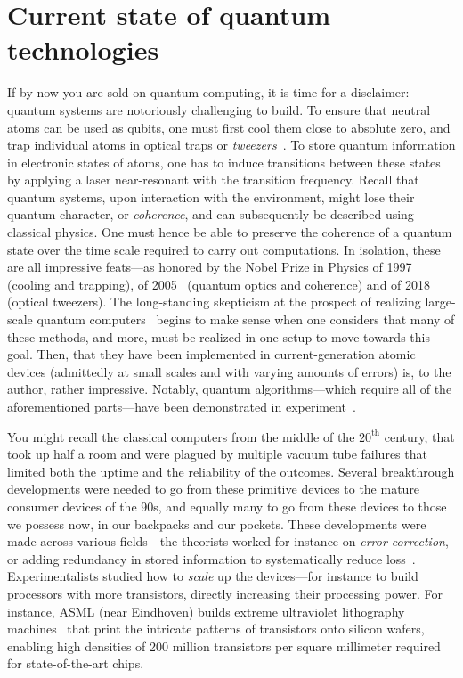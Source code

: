 \documentclass[main.tex]{subfiles}
\begin{document}
\section{Current state of quantum technologies}
If by now you are sold on quantum computing, it is time for a disclaimer: quantum systems are notoriously challenging to build. To ensure that neutral atoms can be used as qubits, one must first cool them close to absolute zero, and trap individual atoms in optical traps or \emph{tweezers}~\cite{shannon2021}. To store quantum information in electronic states of atoms, one has to induce transitions between these states by applying a laser near-resonant with the transition frequency. Recall that quantum systems, upon interaction with the environment, might lose their quantum character, or \emph{coherence}, and can subsequently be described using classical physics. One must hence be able to preserve the coherence of a quantum state over the time scale required to carry out computations. In isolation, these are all impressive feats---as honored by the Nobel Prize in Physics of 1997~\cite{nobel1997} (cooling and trapping), of 2005~\cite{nobel2005} (quantum optics and coherence) and of 2018~\cite{nobel2018} (optical tweezers). The long-standing skepticism at the prospect of realizing large-scale quantum computers~\cite{dyakonov2020will, aaronson2004multilinear, kalai2016quantum} begins to make sense when one considers that many of these methods, and more, must be realized in one setup to move towards this goal. Then, that they have been implemented in current-generation atomic devices (admittedly at small scales and with varying amounts of errors) is, to the author, rather impressive. Notably, quantum algorithms---which require all of the aforementioned parts---have been demonstrated in experiment~\cite{Bluvstein_2023, reichardt2024, graham_multi-qubit_2022, PhysRevA.111.032611}.  

You might recall the classical computers from the middle of the $20^{\mathrm{th}}$ century, that took up half a room and were plagued by multiple vacuum tube failures that limited both the uptime and the reliability of the outcomes. Several breakthrough developments were needed to go from these primitive devices to the mature consumer devices of the 90s, and equally many to go from these devices to those we possess now, in our backpacks and our pockets. These developments were made across various fields---the theorists worked for instance on \emph{error correction}, or adding redundancy in stored information to systematically reduce loss~\cite{hamming1950error}. Experimentalists studied how to \emph{scale} up the devices---for instance to build processors with more transistors, directly increasing their processing power. For instance, ASML (near Eindhoven) builds extreme ultraviolet lithography machines~\cite{wu2007extreme} that print the intricate patterns of transistors onto silicon wafers, enabling high densities of 200 million transistors per square millimeter required for state-of-the-art chips. %
\end{document}
